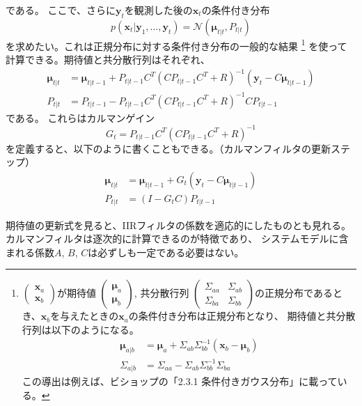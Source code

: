 \documentclass[textwidth-limit=45]{bxjsarticle}
\begin{document}
である。
ここで、さらに$\bm y_t$を観測した後の$\bm x_t$の条件付き分布
\begin{equation}
  p(\bm x_{t}|\bm y_1, \dots, \bm y_{t}) = \mathcal N(\bm \mu_{t|t}, P_{t|t})
\end{equation}
を求めたい。これは正規分布に対する条件付き分布の一般的な結果
\footnote{
  $\begin{pmatrix}
    \bm x_{a} \\
    \bm x_{b}
  \end{pmatrix}
  $が期待値
  $\begin{pmatrix}
    \bm \mu_{a} \\
    \bm \mu_{b}
  \end{pmatrix}
  $, 共分散行列
  $\begin{pmatrix}
    \Sigma_{aa} & \Sigma_{ab} \\
    \Sigma_{ba} & \Sigma_{bb}
  \end{pmatrix}
  $の正規分布であるとき、$\bm x_b$を与えたときの$\bm x_a$の条件付き分布は正規分布となり、
  期待値と共分散行列は以下のようになる。
  \begin{align}
    \bm \mu_{a|b} &= \bm \mu_{a} + \Sigma_{ab} \Sigma_{bb}^{-1} (\bm x_b - \bm \mu_{b}) \\
    \Sigma_{a|b} &= \Sigma_{aa} - \Sigma_{ab} \Sigma_{bb}^{-1} \Sigma_{ba}
  \end{align}
  この導出は例えば、ビショップの「2.3.1 条件付きガウス分布」に載っている。
}
を使って計算できる。期待値と共分散行列はそれぞれ、
\begin{align}
  \bm \mu_{t|t} &= \bm \mu_{t|t-1} + P_{t|t-1}C^T (C P_{t|t-1} C^T + R)^{-1} (\bm y_t - C\bm \mu_{t|t-1})  \\
  P_{t|t} &= P_{t|t-1} - P_{t|t-1} C^T (C P_{t|t-1} C^T + R)^{-1} C P_{t|t-1}
\end{align}
である。
これらはカルマンゲイン
\begin{equation}
  G_t = P_{t|t-1} C^T (C P_{t|t-1} C^T + R)^{-1}
\end{equation}
を定義すると、以下のように書くこともできる。（カルマンフィルタの更新ステップ）
\begin{align}
  \bm \mu_{t|t} &= \bm \mu_{t|t-1} + G_t (\bm y_t - C\bm \mu_{t|t-1})  \\
  P_{t|t} &= (I- G_t C) P_{t|t-1}
\end{align}

期待値の更新式を見ると、IIRフィルタの係数を適応的にしたものとも見れる。
カルマンフィルタは逐次的に計算できるのが特徴であり、
システムモデルに含まれる係数$A$, $B$, $C$は必ずしも一定である必要はない。
\end{document}
